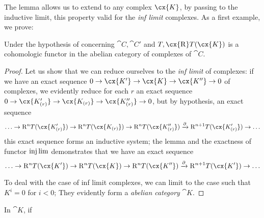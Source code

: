 The lemma  allows us to extend to any complex $\cx{K}$, by passing to the inductive limit,  
this property valid for the \emph{inf limit} complexes.
As a first example, we prove:

\begin{proposition}[11.5.2]
\label{0.11.5.2}
Under the hypothesis of  concerning $\cat{C}, \cat{C'}$ and $T, \cx{\RR} T(\cx{K})$ 
is a cohomologic functor in the abelian category of complexes of $\cat{C}$.
\end{proposition}

\begin{proof}
Let us show that we can reduce ourselves to the \emph{inf limit} of complexes: 
if we have an exact sequence $0 \rightarrow \cx{K'} \rightarrow \cx{K} \rightarrow \cx{K''} \rightarrow 0$ of complexes, 
we evidently reduce for each $r$ an exact sequence $0 \rightarrow \cx{K'_{(r)}} \rightarrow \cx{K_{(r)}} \rightarrow \cx{K''_{(r)}} \rightarrow 0$, 
but by hypothesis, an exact sequence
\[
  \ldots \rightarrow \RR^n T(\cx{K'_{(r)}}) \rightarrow \RR^n T(\cx{K_{(r)}}) \rightarrow \RR^n T(\cx{K''_{(r)}}) \xrightarrow[]{\partial} \RR^{n+1} T(\cx{K'_{(r)}}) \rightarrow \ldots
\]
this exact sequence forms an inductive system; the lemma  and the exactness of functor $\injlim$ demonstrates that we have an exact sequence
\[
  \ldots \rightarrow \RR^n T(\cx{K'}) \rightarrow \RR^n T(\cx{K}) \rightarrow \RR^n T(\cx{K''}) \xrightarrow[]{\partial} \RR^{n+1} T(\cx{K'}) \rightarrow \ldots
\]

To deal with the case of inf limit complexes, we can limit to the case such that $K^i=0$ for $i<0$;
They evidently form a \emph{abelian category} $\cat{K}$.
\end{proof}

\begin{lemma}[11.5.2.1]
\label{0.11.5.2.1}
In $\cat{K}$, if 
\end{lemma}
  
\begin{corollary}[11.5.2.2]
\label{0.11.5.2.2}
\end{corollary}
  
\begin{env}[11.5.2.3]
\label{0.11.5.2.3}
\end{env}
  
\begin{lemma}[11.5.2.4]
\label{0.11.5.2.4}
\end{lemma}

\begin{env}[11.5.2.5]
\label{0.11.5.2.5}
\end{env}

